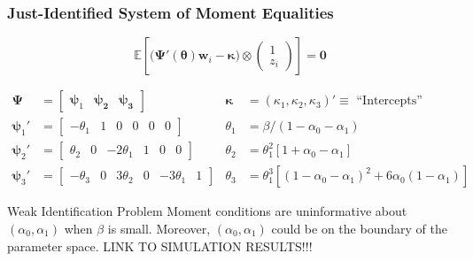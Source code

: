 \documentclass{beamer}
\begin{document}
\begin{frame}
  \frametitle{Just-Identified System of Moment Equalities}

\[
\boxed{\mathbb{E}\left[
  \big(\boldsymbol{\Psi}'(\boldsymbol{\theta})\mathbf{w}_i - \boldsymbol{\kappa}\big) \otimes 
\left(
\begin{array}{c}
  1 \\ z_i
\end{array}\right)
\right] = \mathbf{0}}
\]

\footnotesize
\begin{align*}
\boldsymbol{\Psi} &= \left[
  \begin{array}{ccc}
    \boldsymbol{\psi}_1 & \boldsymbol{\psi_2} & \boldsymbol{\psi_3}
\end{array}\right]
& \boldsymbol{\kappa} &= (\kappa_1, \kappa_2, \kappa_3)' \equiv \mbox{ ``Intercepts''}\\
  \boldsymbol{\psi}_1' &= \left[
  \begin{array}{cccccc}
-\theta_1 & 1 & 0 & 0 & 0 & 0
  \end{array}
\right] & \theta_1 &= \beta / (1 - \alpha_0 - \alpha_1)\\
  \boldsymbol{\psi}_2' &= \left[
  \begin{array}{cccccc}
\theta_2& 0& -2\theta_1& 1& 0& 0
  \end{array}
\right] & \theta_2 &= \theta_1^2 \left[ 1 + \alpha_0 - \alpha_1 \right]\\
  \boldsymbol{\psi}_3' &= \left[
  \begin{array}{cccccc}
-\theta_3& 0& 3\theta_2& 0& -3\theta_1& 1
  \end{array}
\right] & \theta_3 &= \theta_1^3 \left[ \left( 1 - \alpha_0 - \alpha_1 \right)^2 + 6\alpha_0 (1 - \alpha_1) \right] 
\end{align*}

\begin{alertblock}{Weak Identification Problem}
  Moment conditions are uninformative about $(\alpha_0,\alpha_1)$ when $\beta$ is small.
  Moreover, $(\alpha_0,\alpha_1)$ could be on the boundary of the parameter space.
  LINK TO SIMULATION RESULTS!!!
\end{alertblock}



\end{frame}
\end{document}
